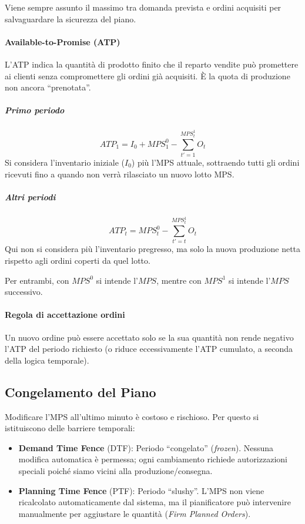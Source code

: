 \begin{note}
    Viene sempre assunto il massimo tra domanda prevista e ordini acquisiti per
    salvaguardare la sicurezza del piano.
\end{note}

%
\paragraph{Available-to-Promise (ATP)} L'ATP indica la quantità di prodotto finito che il reparto vendite può promettere ai clienti senza compromettere gli ordini già acquisiti. È la quota di produzione non ancora ``prenotata''.

\noindent %
\begin{minipage}[t]{0.48\textwidth} %
    \subparagraph{Primo periodo}
    \[
        \mathit{ATP}_{1} = I_{0} + \mathit{MPS}^{0}_{1} - \sum_{t'=1}^{\mathit{MPS}^{1}_{t}} O_{t}
    \]
    \small Si considera l'inventario iniziale ($I_{0}$) più l'MPS attuale, sottraendo tutti gli ordini ricevuti fino a quando non verrà rilasciato un nuovo lotto MPS.
\end{minipage}
\hfill
\begin{minipage}[t]{0.48\textwidth}
    \subparagraph{Altri periodi}
    \[
        \mathit{ATP}_{t} = \mathit{MPS}^{0}_{t} - \sum_{t'=t}^{\mathit{MPS}^{1}_{t}} O_{t}
    \]
    \small Qui non si considera più l'inventario pregresso, ma solo la nuova produzione netta rispetto agli ordini coperti da quel lotto.
\end{minipage}

Per entrambi, con $ \mathit{MPS}^{0} $ si intende l'$ \mathit{MPS} $, mentre con $ \mathit{MPS}^{1} $ si intende l'$ \mathit{MPS} $ successivo.

%
\paragraph{Regola di accettazione ordini} Un nuovo ordine può essere accettato solo se la sua quantità non rende negativo l'ATP del periodo richiesto (o riduce eccessivamente l'ATP cumulato, a seconda della logica temporale).

%
\subsection{Congelamento del Piano}
Modificare l'MPS all'ultimo minuto è costoso e rischioso. Per questo si istituiscono delle barriere temporali:
\begin{itemize}
    \item \textbf{Demand Time Fence} (DTF): Periodo ``congelato'' (\emph{frozen}). Nessuna modifica automatica è permessa; ogni cambiamento richiede autorizzazioni speciali poiché siamo vicini alla produzione/consegna.
    \item \textbf{Planning Time Fence} (PTF): Periodo ``slushy''. L'MPS non viene ricalcolato automaticamente dal sistema, ma il pianificatore può intervenire manualmente per aggiustare le quantità (\emph{Firm Planned Orders}).
\end{itemize}

